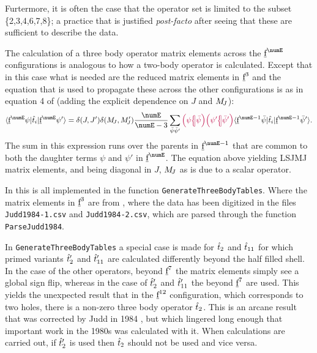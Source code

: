 \documentclass{article}
\newcommand{\codetext}[1]{{\color{BlueViolet} \texttt{#1}}}
\begin{document}
Furtermore, it is often the case that the operator set is limited to the subset \{2,3,4,6,7,8\}; a practice that is justified \textit{post-facto} after seeing that these are sufficient to describe the data.

The calculation of a three body operator matrix elements across the $\forb^{\numE}$ configurations is analogous to how a two-body operator is calculated. Except that in this case what is needed are the reduced matrix elements in $\underbar{$\text{f}$}^3$ and the equation that is used to propagate these across the other configurations is as in equation 4 of \cite{judd_three-particle_1966} (adding the explicit dependence on $J$ and $M_{\!{J}}$):
\begin{equation} 
	\braopket{\forb^{\numE}\psi}
		{\op{t}_i}
		{\forb^{\numE}\psi'} =
		\kronecker{J}{J'}
		\kronecker{\Msub{J}}{\Msub{J}'} 
		\frac{\numE}{\numE-3} 
		\sum_{\bar{\psi}\bar{\psi}'}
			\cfpinv{\psi}{\bar{\psi}}
        	\cfpinv{\psi'}{\bar{\psi}'}
        	\braopket{\forb^{\numE-1}\bar{\psi}}{\op{t}_i}{\forb^{\numE-1}\bar{\psi}'}.
\label{eqn:three body escalator}
\end{equation}
The sum in this expression runs over the parents in $\forb^{\numE-1}$ that are common to both the daughter terms $\psi$ and $\psi'$ in $\forb^{\numE}$. The equation above yielding LSJMJ matrix elements, and being diagonal in $J$, $M_{\!{J}}$ as is due to a scalar operator.

In \qlanth this is all implemented in the function \codetext{GenerateThreeBodyTables}. Where the matrix elements in $\underbar{$\text{f}$}^3$ are from \cite{judd_complete_1984}, where the data has been digitized in the files \codetext{Judd1984-1.csv} and \codetext{Judd1984-2.csv}, which are parsed through the function \codetext{ParseJudd1984}.
 
 In \codetext{GenerateThreeBodyTables} a special case is made for $\hat{t}_2$ and $\hat{t}_{11}$ for which primed variants $\hat{t}_2'$ and $\hat{t}_{11}'$ are calculated differently beyond the half filled shell. In the case of the other operators, beyond $\underbar{$\text{f}$}^7$ the matrix elements simply see a global sign flip, whereas in the case of $\hat{t}_2'$ and $\hat{t}_{11}'$ the \cfps beyond $\underbar{$\text{f}$}^7$ are used. This yields the unexpected result that in the $\underbar{$\text{f}$}^{12}$ configuration, which corresponds to two holes, there is a non-zero three body operator $\hat{t}_2$. This is an arcane result that was corrected by Judd in 1984 \cite{judd_complete_1984}, but which lingered long enough that important work in the 1980s was calculated with it. When calculations are carried out, if $\hat{t}_2'$ is used then $\hat{t}_2$ should not be used and  vice versa.
 
\end{document}
